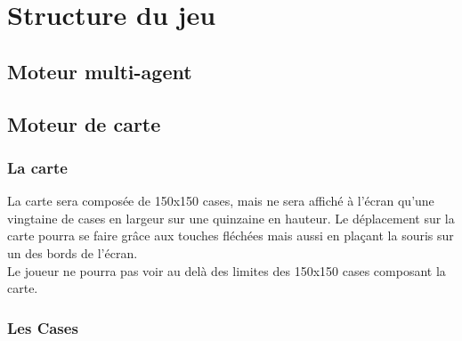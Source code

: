 \documentclass[a4paper]{article}
\newcommand{\alinea}{\hspace*{0.5cm}}
\begin{document}
    \section{Structure du jeu}
    
      \subsection{Moteur multi-agent}
        
      \subsection{Moteur de carte}
    
        \subsubsection{La carte}

          \alinea La carte sera composée de 150x150 cases, mais ne sera affiché à l'écran qu'une vingtaine de cases en largeur sur une quinzaine en hauteur. Le déplacement sur la carte pourra se faire grâce aux touches fléchées mais aussi en plaçant la souris sur un des bords de l'écran.\\
          Le joueur ne pourra pas voir au delà des limites des 150x150 cases composant la carte.

        \subsubsection{Les Cases}
\end{document}

